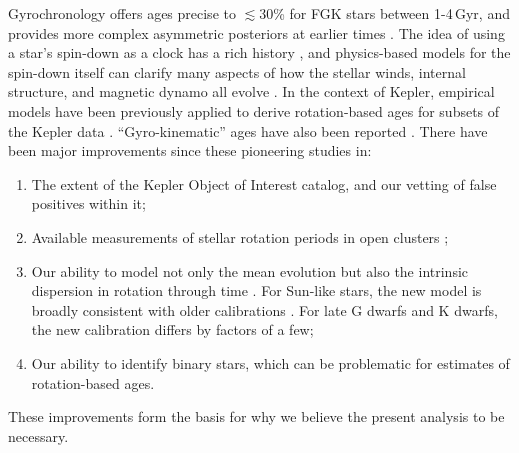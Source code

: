 \documentclass[11pt,twocolumn,tighten]{aastex63}
\begin{document}
Gyrochronology offers ages precise to $\lesssim$30\% for FGK stars
between 1-4\,Gyr, and provides more complex asymmetric posteriors at
earlier times \citep{Bouma_2023}.  The idea of using a star's
spin-down as a clock has a rich history
\citep{Skumanich_1972,Noyes_1984,Kawaler_1989,Barnes03,Mamajek_2008,Angus_2015},
and physics-based models for the spin-down itself can clarify many
aspects of how the stellar winds, internal structure, and magnetic
dynamo all evolve
\citep[e.g.][]{Matt_2015,Gallet_Bouvier_2015,Spada_2020}.  In the
context of Kepler, empirical models have been previously applied to
derive rotation-based ages for subsets of the Kepler data
\citep{Walkowicz_2013,Reinhold_2015,Angus_2018}.  ``Gyro-kinematic''
ages have also been reported \citep{2021AJ....161..189L}.  There have
been major improvements since these pioneering studies in:
\begin{enumerate}[label={\it \roman*)},leftmargin=*,topsep=0pt,itemsep=-1ex,partopsep=1ex,parsep=1ex]
  \item The extent of the Kepler Object of Interest catalog, and our
    vetting of false positives within it;
  \item Available measurements of stellar rotation periods in open
    clusters
    \citep[e.g.][]{Curtis_2019_ngc6811,Gillen_2020,Rampalli_2021,Fritzewski_2021,Rebull_2022,Dungee_2022,2023AJ....166...14B};
  \item Our ability to model not only the mean evolution but also the
    intrinsic dispersion in rotation through time \citep{Bouma_2023}.
    For Sun-like stars, the new model is broadly consistent with older
    calibrations \citep[e.g.][]{Mamajek_2008}.  For late G dwarfs and
    K dwarfs, the new calibration differs by factors of a few;
  \item Our ability to identify binary stars, which can be problematic
    for estimates of rotation-based ages.
\end{enumerate}
These improvements form the basis for why we believe the present
analysis to be necessary.
\end{document}
